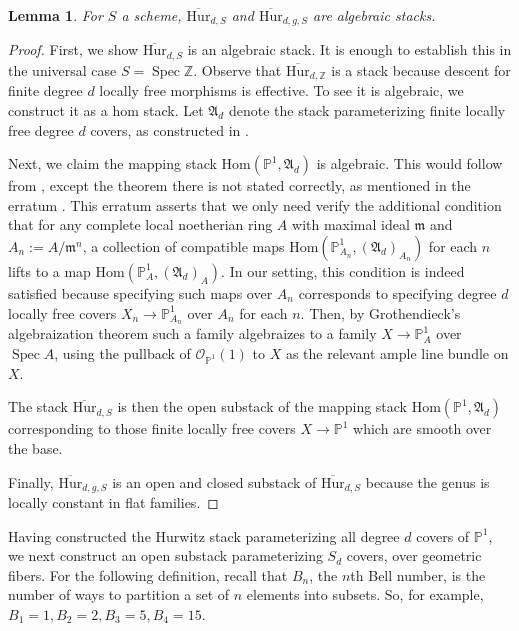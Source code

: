 \documentclass[12 pt]{amsart}
\newcommand{\rboxed}[1]{#1}
\theoremstyle{plain}
\newtheorem{lemma}[theorem]{Lemma}
\theoremstyle{definition}
\theoremstyle{remark}
\numberwithin{equation}{section}
\newcommand\bp{\mathbb P}
\newcommand\bz{\mathbb Z}
\newcommand\fm{{\mathfrak m}}
\newcommand\sco{\mathscr O}
\DeclareMathOperator\spec{\operatorname{Spec}}
\newcommand\bighur[2]{\overline{\mathrm{Hur}}_{#1,#2}} %
\newcommand\bighurg[3]{\overline{\mathrm{Hur}}_{#1,#2, #3}} %
\renewcommand\hom{\mathrm{Hom}}
\begin{document}
\begin{lemma} \label{lemma:big-hur-algebraic} For $S$ a scheme, $\bighur d S$ and $\bighurg d g
S$ are algebraic stacks.  \end{lemma} \begin{proof} First, we show $\bighur d S$
	is an algebraic stack.  It is enough to establish this in the universal
	case $S = \spec \bz$.  Observe that $\bighur d \bz$ is a stack because
	descent for finite degree $d$ locally free morphisms is effective.  To
	see it is algebraic, we construct it as a hom stack.  Let
	$\rboxed{\mathfrak A_d}$ denote the stack parameterizing finite locally
	free degree $d$ covers, as constructed in \cite[Def.\ 3.2]{Poonen2008}.

	Next, we claim the mapping stack $\hom(\bp^1, \mathfrak A_d)$ is
	algebraic.  This would follow from \cite[Thm.\  1.1]{aoki:hom-stacks},
	except the theorem there is not stated correctly, as mentioned in the
	erratum \cite{aoki:erratum-hom-stacks}.  This erratum asserts that we
	only need verify the additional condition that for any complete local
	noetherian ring $A$ with maximal ideal $\fm$ and $\rboxed{A_n} :=
	A/\fm^n$, a collection of compatible maps $\hom(\bp^1_{A_n}, (\mathfrak
	A_d)_{A_n})$ for each $n$ lifts to a map $\hom(\bp^1_{A}, (\mathfrak
	A_d)_{A})$.  In our setting, this condition is indeed satisfied because
	specifying such maps over $A_n$ corresponds to specifying degree $d$
	locally free covers $X_n \to \bp^1_{A_n}$ over $A_n$ for each $n$. 
	Then, by Grothendieck's algebraization theorem \cite[Thm.\
	8.4.10]{FantechiGIK:fundamentalAlgebraicGeometry} such a family
	algebraizes to a family $X \to \bp^1_A$ over $\spec A$, using the
	pullback of $\sco_{\bp^1}(1)$ to $X$ as the relevant ample line bundle
	on $X$.

	The stack $\bighur d S$ is then the open substack of the mapping stack
	$\hom(\bp^1, \mathfrak A_d)$ corresponding to those finite locally free
	covers $X \to \bp^1$ which are smooth over the base.
%
	
	Finally, $\bighurg d g S$ is an open and closed substack of $\bighur d
S$ because the genus is locally constant in flat families.  \end{proof}

Having constructed the Hurwitz stack parameterizing all degree $d$ covers of
$\bp^1$, we next construct an open substack parameterizing $S_d$ covers,
over geometric fibers.
For the following definition, recall that $B_n$, the $n$th Bell number, is
the number of ways to partition a set of $n$ elements into subsets.
So, for example, $B_1 = 1, B_2 = 2, B_3 = 5, B_4 = 15$.
\end{document}
